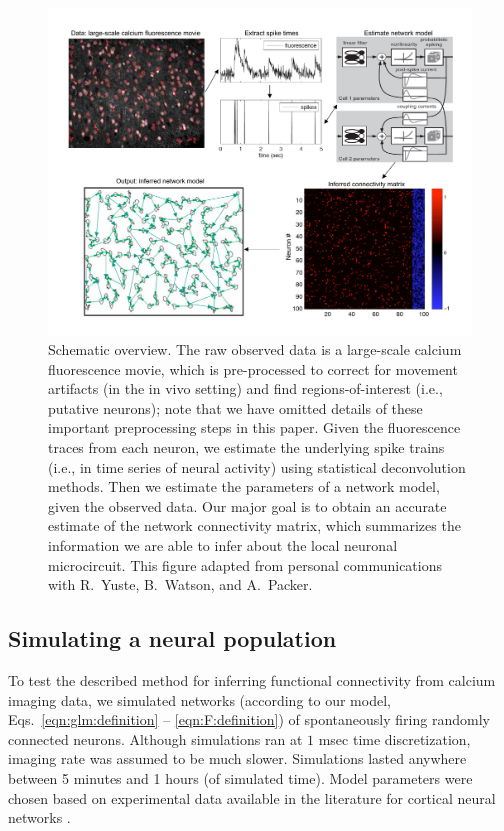 \begin{figure}[t!] 
	\centering 
	\includegraphics[width=\hsize]{../figs/yuri-paper-schematic} 
	\caption{Schematic overview. The raw observed data is a large-scale calcium fluorescence movie, which is pre-processed to correct for movement artifacts (in the in vivo setting) and find regions-of-interest (i.e., putative neurons); note that we have omitted details of these important preprocessing steps in this paper. Given the fluorescence traces from each neuron, we estimate the underlying spike trains (i.e., in time series of neural activity) using statistical deconvolution methods. Then we estimate the parameters of a network model, given the observed data. Our major goal is to obtain an accurate estimate of the network connectivity matrix, which summarizes the information we are able to infer about the local neuronal microcircuit. This figure adapted from personal communications with R.\ Yuste, B.\ Watson, and A.\ Packer.} 
	\label{fig:data_schematic} 
\end{figure}

\subsection{Simulating a neural population} \label{sec:results:simulations}

To test the described method for inferring functional connectivity from calcium imaging data, we simulated networks (according to our model, Eqs.~\eqref{eqn:glm:definition} -- \eqref{eqn:F:definition}) of spontaneously firing randomly connected neurons. Although simulations ran at $1$ msec time discretization, imaging rate was assumed to be much slower. Simulations lasted anywhere between 5 minutes and 1 hours (of simulated time). Model parameters were chosen based on experimental data available in the literature for cortical neural networks \cite{Braitenberg1998,Urquijo2000,Lefort2009,Sayer1990}.

